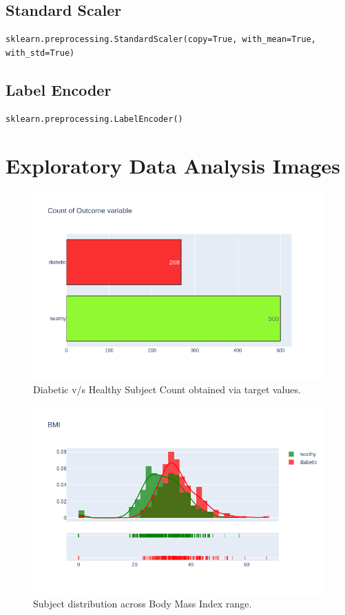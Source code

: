 \documentclass[12pt]{article}
\begin{document}
\subsection{Standard Scaler}
\begin{lstlisting}
sklearn.preprocessing.StandardScaler(copy=True, with_mean=True, with_std=True)
\end{lstlisting}

\subsection{Label Encoder}
\begin{lstlisting}
sklearn.preprocessing.LabelEncoder()
\end{lstlisting}

\clearpage
\section{Exploratory Data Analysis Images}

\begin{figure}[ht]
\centering
\includegraphics[width=1\textwidth]{1.png}
\caption{\label{fig:8} Diabetic v/s Healthy Subject Count obtained via target values.}
\end{figure}

\begin{figure}[ht]
\centering
\includegraphics[width=1\textwidth]{10.png}
\caption{\label{fig:1} Subject distribution across Body Mass Index range.}
\end{figure}
\end{document}
